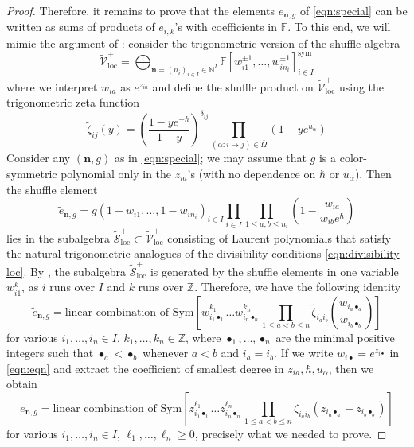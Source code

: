\documentclass{amsart}
\def\BF{{\mathbb{F}}}
\def\BZ{{\mathbb{Z}}}
\def\CS{{\mathcal{S}}}
\def\CV{{\mathcal{V}}}
\def\sym{\textrm{sym}}
\def\nn{{\mathbb{N}^I}}
\def\bn{{\boldsymbol{n}}}
\def\edge{\Omega}
\def\field{\BF}
\begin{document}
\begin{proof}
\noindent Therefore, it remains to prove that the elements $e_{\bn,g}$ of \eqref{eqn:special} can be written as sums of products of $e_{i,k}$'s with coefficients in $\field$. To this end, we will mimic the argument of \cite[Lemma 2.13]{NGen}: consider the trigonometric version of the shuffle algebra
\begin{equation}
\label{eqn:tilde v}
\widetilde{\CV}^+_{\text{loc}} = \bigoplus_{\bn = (n_i)_{i \in I} \in \nn} \field[w_{i1}^{\pm 1},\dots,w_{in_i}^{\pm 1}]^{\sym}_{i \in I}
\end{equation}
where we interpret $w_{ia}$ as $e^{z_{ia}}$ and define the shuffle product on $\widetilde{\CV}^+_{\text{loc}}$ using the trigonometric zeta function
$$
\widetilde{\zeta}_{ij}(y) = \left(\frac {1-ye^{-\hbar}}{1-y} \right)^{\delta_{ij}} \prod_{(\alpha : i \rightarrow j) \in \bar{\edge}} (1-ye^{u_\alpha})
$$
Consider any $(\bn,g)$ as in \eqref{eqn:special}; we may assume that $g$ is a color-symmetric polynomial only in the $z_{ia}$'s (with no dependence on $\hbar$ or $u_\alpha$). Then the shuffle element
$$
\widetilde{e}_{\bn,g} = g(1-w_{i1},\dots,1-w_{in_i})_{i \in I} \prod_{i \in I} \prod_{1 \leq a , b \leq n_i} \left(1- \frac {w_{ia}}{w_{ib}e^\hbar}\right) 
$$
lies in the subalgebra $\widetilde{\CS}^+_{\text{loc}} \subset \widetilde{\CV}^+_{\text{loc}}$ consisting of Laurent polynomials that satisfy the natural trigonometric analogues of the divisibility conditions \eqref{eqn:divisibility loc}. By \cite[Theorem 1.2]{Wheel}, the subalgebra $\widetilde{\CS}^+_{\text{loc}}$ is generated by the shuffle elements in one variable $w_{i1}^k$, as $i$ runs over $I$ and $k$ runs over $\BZ$. Therefore, we have the following identity
\begin{equation}
\label{eqn:eqn}
\widetilde{e}_{\bn,g} = \text{linear combination of Sym} \left[w_{i_1\bullet_1}^{k_1} \dots w_{i_n\bullet_n}^{k_n} \prod_{1 \leq a < b \leq n} \widetilde{\zeta}_{i_ai_b} \left(\frac {w_{i_a\bullet_a}}{w_{i_b\bullet_b}} \right) \right]
\end{equation}
for various $i_1,\dots,i_n \in I$, $k_1,\dots,k_n \in \BZ$, where $\bullet_1,\dots,\bullet_n$ are the minimal positive integers such that $\bullet_a < \bullet_b$ whenever $a<b$ and $i_a = i_b$. If we write $w_{i\bullet} = e^{z_{i\bullet}}$ in \eqref{eqn:eqn} and extract the coefficient of smallest degree in $z_{ia},\hbar,u_\alpha$, then we obtain
$$
e_{\bn,g} = \text{linear combination of Sym} \left[z_{i_1\bullet_1}^{\ell_1} \dots z_{i_n\bullet_n}^{\ell_n} \prod_{1 \leq a < b \leq n} \zeta_{i_ai_b} \left(z_{i_a\bullet_a} - z_{i_b\bullet_b} \right) \right]
$$
for various $i_1,\dots,i_n \in I$, $\ell_1,\dots,\ell_n \geq 0$, precisely what we needed to prove. \end{proof} 
\end{document}
